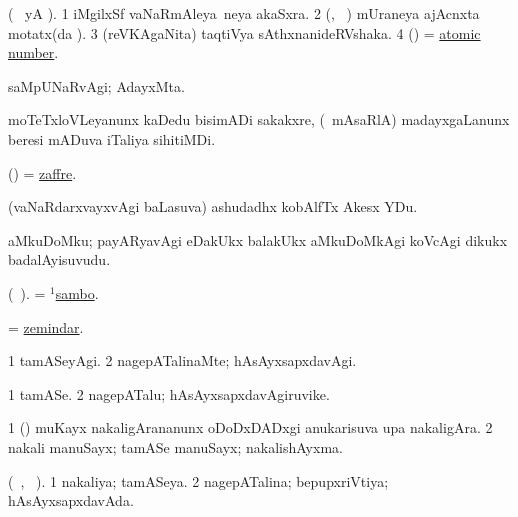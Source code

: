 \bentry
{}
\gl{\nA}  
\bmng
(\bava\   yA ). 
\bnum
\num{1} iMgilxSf vaNaRmAleya \,neya akaSxra. 
\num{2} (\biVga, \sA\ ) mUraneya ajAcnxta motatx(da \saMkeV). 
\num{3} (reVKAgaNita) taqtiVya sAthxnanideRVshaka.  
\num{4} (\ravi) =  \hyperref{kandict_a.pdf}{A}{atomic number}{atomic number}.
\enum
\emng

\noindent
\gl{\pagu} 
\bmng
{} saMpUNaRvAgi; AdayxMta.
\emng
\eentry

\bentry
{} 
\gl{\nA}
\bmng
moTeTxloVLeyanunx kaDedu bisimADi sakakxre, (\kanmu\ mAsaRlA) madayxgaLanunx beresi mADuva iTaliya sihitiMDi.
\emng
\eentry

\bentry
{} 
\gl{\nA} 
\bmng
(\ame) = \hyperlink{zaffre}{zaffre}. 
\emng
\eentry

\bentry
{} 
\gl{\nA} 
\bmng
(vaNaRdarxvayxvAgi baLasuva) ashudadhx kobAlfTx Akesx YDu.
\emng
\eentry

\bentry
{} 
\gl{\nA} 
\bmng
aMkuDoMku; payARyavAgi eDakUkx balakUkx aMkuDoMkAgi koVcAgi dikukx badalAyisuvudu.
\emng
\eentry

\bentry
{} 
\gl{\nA} 
\bmng
(\bava\ ).
= \hyperref{kandict_s.pdf}{S}{sambo(1)}{$^1$sambo}.
\emng
\eentry

\bentry
{} 
\gl{\nA} 
\bmng
= \hyperlink{zemindar}{zemindar}.
\emng
\eentry

\bentry
{} 
\gl{\kirxvi} 
\bmng
\bnum
\num{1} tamASeyAgi. 
\num{2} nagepATalinaMte; hAsAyxsapxdavAgi.
\enum
\emng
\eentry

\bentry
{} 
\gl{\nA} 
\bmng
\bnum
\num{1} tamASe.
\num{2} nagepATalu; hAsAyxsapxdavAgiruvike.
\enum
\emng
\eentry

\bentry
{} 
\gl{\saMkiSx}
\bmng
{}
\emng
\eentry

\bentry
{} 
\gl{\nA} 
\bmng
\bnum
\num{1} (\ca) muKayx nakaligArananunx oDoDxDADxgi  anukarisuva upa nakaligAra. 
\num{2} nakali manuSayx; tamASe manuSayx; nakalishAyxma.
\enum
\emng
\eentry

\bentry 
{} 
\gl{\gu} 
\bmng
(\tara\ , \tama\ ).  
\bnum
\num{1} nakaliya; tamASeya. 
\num{2} nagepATalina; bepupxriVtiya; hAsAyxsapxdavAda.
\enum
\emng
\eentry

